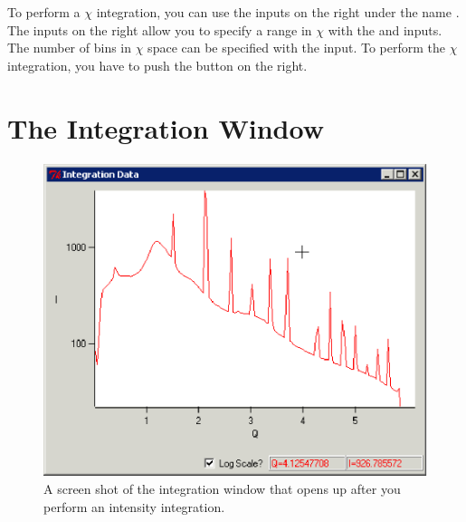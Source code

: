 To perform a $\chi$ integration, you can use the inputs
on the right under the name .
The inputs on the right allow you to specify
a range in $\chi$ with the  and
 inputs. The number of bins in
$\chi$ space can be specified with the
 input. To perform the
$\chi$ integration, you have to push the
 button on the right.

\section{The Integration Window}

\begin{figure}
\centering
\includegraphics[scale=.75]{figures/integration_window_q.eps}
\caption{A screen shot of the integration window that
    opens up after you perform an intensity integration.} 
\label{integration_window_q}
\end{figure}


